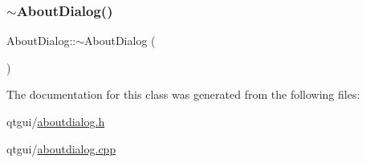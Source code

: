 \mbox{\label{class_about_dialog_a3d87f5a26a175bb2573965c98af6d4ca}} 
\subsubsection{\texorpdfstring{$\sim$AboutDialog()}{~AboutDialog()}}
{\footnotesize\ttfamily About\+Dialog\+::$\sim$\+About\+Dialog (\begin{DoxyParamCaption}{ }\end{DoxyParamCaption})}



The documentation for this class was generated from the following files\+:\begin{DoxyCompactItemize}
\item 
qtgui/\mbox{\hyperlink{aboutdialog_8h}{aboutdialog.\+h}}\item 
qtgui/\mbox{\hyperlink{aboutdialog_8cpp}{aboutdialog.\+cpp}}\end{DoxyCompactItemize}
